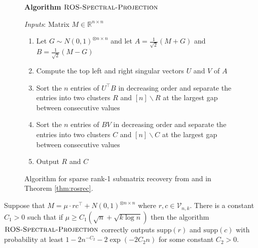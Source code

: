 \begin{figure}[t!]
\begin{algbox}
\textbf{Algorithm} $\textsc{ROS-Spectral-Projection}$
\vspace{2mm}

\textit{Inputs}: Matrix $M \in \mathbb{R}^{n \times n}$
\begin{enumerate}
\item Let $G \sim N(0, 1)^{\otimes n \times n}$ and let $A = \frac{1}{\sqrt{2}}(M + G)$ and $B = \frac{1}{\sqrt{2}}(M - G)$
\item Compute the top left and right singular vectors $U$ and $V$ of $A$
\item Sort the $n$ entries of $U^\top B$ in decreasing order and separate the entries into two clusters $R$ and $[n] \backslash R$ at the largest gap between consecutive values
\item Sort the $n$ entries of $B V$ in decreasing order and separate the entries into two clusters $C$ and $[n] \backslash C$ at the largest gap between consecutive values
\item Output $R$ and $C$
\end{enumerate}
\vspace{1mm}
\end{algbox}
\caption{Algorithm for sparse rank-1 submatrix recovery from \cite{cai2015computational} and in Theorem \ref{thm:rosrec}.}
\label{fig:rosspectral}
\end{figure}

\begin{theorem} \label{thm:rosrec}
Suppose that $M = \mu \cdot rc^\top + N(0, 1)^{\otimes n \times n}$ where $r, c \in \mathcal{V}_{n, k}$. There is a constant $C_1 > 0$ such that if $\mu \ge C_1(\sqrt{n} + \sqrt{k \log n})$ then the algorithm $\textsc{ROS-Spectral-Projection}$ correctly outputs $\text{supp}(r)$ and $\text{supp}(c)$ with probability at least $1 - 2n^{-C_2} - 2\exp(-2C_2n)$ for some constant $C_2 > 0$.
\end{theorem}

